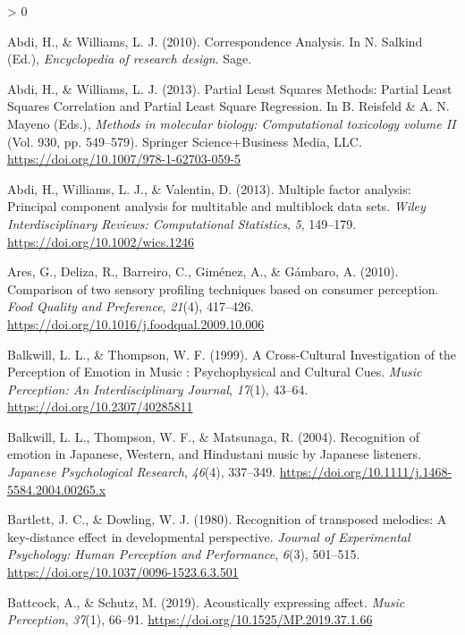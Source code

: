 \documentclass[
  english,
  man,floatsintext]{apa6}
\newlength{\cslhangindent}
\newenvironment{CSLReferences}[2] %
 {%
  \setlength{\parindent}{0pt}
  \ifodd #1 \everypar{\setlength{\hangindent}{\cslhangindent}}\ignorespaces\fi
  \ifnum #2 > 0
  \setlength{\parskip}{#2\baselineskip}
  \fi
 }%
 {}
\begin{document}
\hypertarget{refs}{}
\begin{CSLReferences}{1}{0}
\leavevmode\hypertarget{ref-Abdi2010d}{}%
Abdi, H., \& Williams, L. J. (2010). {Correspondence Analysis}. In N. Salkind (Ed.), \emph{Encyclopedia of research design}. Sage.

\leavevmode\hypertarget{ref-Abdi2013a}{}%
Abdi, H., \& Williams, L. J. (2013). {Partial Least Squares Methods: Partial Least Squares Correlation and Partial Least Square Regression}. In B. Reisfeld \& A. N. Mayeno (Eds.), \emph{Methods in molecular biology: Computational toxicology volume II} (Vol. 930, pp. 549--579). Springer Science+Business Media, LLC. \url{https://doi.org/10.1007/978-1-62703-059-5}

\leavevmode\hypertarget{ref-Abdi2013}{}%
Abdi, H., Williams, L. J., \& Valentin, D. (2013). {Multiple factor analysis: Principal component analysis for multitable and multiblock data sets}. \emph{Wiley Interdisciplinary Reviews: Computational Statistics}, \emph{5}, 149--179. \url{https://doi.org/10.1002/wics.1246}

\leavevmode\hypertarget{ref-Ares2010}{}%
Ares, G., Deliza, R., Barreiro, C., Giménez, A., \& Gámbaro, A. (2010). {Comparison of two sensory profiling techniques based on consumer perception}. \emph{Food Quality and Preference}, \emph{21}(4), 417--426. \url{https://doi.org/10.1016/j.foodqual.2009.10.006}

\leavevmode\hypertarget{ref-Balkwill1999}{}%
Balkwill, L. L., \& Thompson, W. F. (1999). {A Cross-Cultural Investigation of the Perception of Emotion in Music : Psychophysical and Cultural Cues}. \emph{Music Perception: An Interdisciplinary Journal}, \emph{17}(1), 43--64. \url{https://doi.org/10.2307/40285811}

\leavevmode\hypertarget{ref-Balkwill2004}{}%
Balkwill, L. L., Thompson, W. F., \& Matsunaga, R. (2004). {Recognition of emotion in Japanese, Western, and Hindustani music by Japanese listeners}. \emph{Japanese Psychological Research}, \emph{46}(4), 337--349. \url{https://doi.org/10.1111/j.1468-5584.2004.00265.x}

\leavevmode\hypertarget{ref-Bartlett1980a}{}%
Bartlett, J. C., \& Dowling, W. J. (1980). {Recognition of transposed melodies: A key-distance effect in developmental perspective}. \emph{Journal of Experimental Psychology: Human Perception and Performance}, \emph{6}(3), 501--515. \url{https://doi.org/10.1037/0096-1523.6.3.501}

\leavevmode\hypertarget{ref-Battcock2019}{}%
Battcock, A., \& Schutz, M. (2019). {Acoustically expressing affect}. \emph{Music Perception}, \emph{37}(1), 66--91. \url{https://doi.org/10.1525/MP.2019.37.1.66}


\end{CSLReferences}
\end{document}
